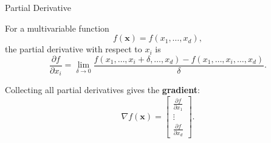 \documentclass[aspectratio=169,12pt]{beamer}
\begin{document}
\begin{frame}[t]{Partial Derivative}
	
	For a multivariable function
	\[
	f(\mathbf{x}) = f(x_1,\ldots,x_d),
	\]
	the partial derivative with respect to $x_i$ is
	\[
	\frac{\partial f}{\partial x_i}
	=
	\lim_{\delta \to 0}
	\frac{
		f(x_1,\ldots,x_i+\delta,\ldots,x_d)
		-
		f(x_1,\ldots,x_i,\ldots,x_d)
	}{\delta}.
	\]
	
	\vspace{0.3cm}
	
	Collecting all partial derivatives gives the \textbf{gradient}:
	\[
	\nabla f(\mathbf{x})
	=
	\begin{bmatrix}
		\frac{\partial f}{\partial x_1} \\
		\vdots \\
		\frac{\partial f}{\partial x_d}
	\end{bmatrix}.
	\]
	
\end{frame}
\end{document}
